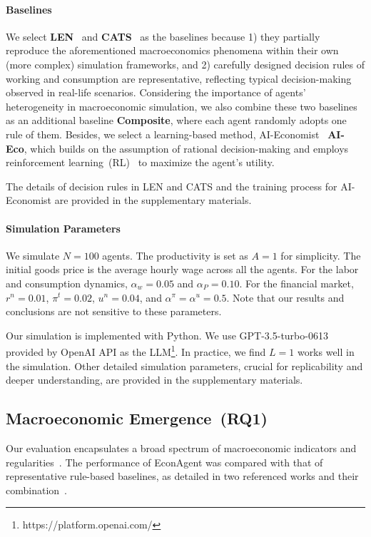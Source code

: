 \paragraph{Baselines} We select \textbf{LEN}~\cite{lengnick2013agent} and \textbf{CATS}~\cite{gatti2011macroeconomics} as the baselines because 1) they partially reproduce the aforementioned macroeconomics phenomena within their own (more complex) simulation frameworks, and 2) carefully designed decision rules of working and consumption are representative, reflecting typical decision-making observed in real-life scenarios. Considering the importance of agents' heterogeneity in macroeconomic simulation, we also combine these two baselines as an additional baseline \textbf{Composite}, where each agent randomly adopts one rule of them.
Besides, we select a learning-based method, AI-Economist~\cite{zheng2022ai} \textbf{AI-Eco}, which builds on the assumption of rational decision-making and employs reinforcement learning~(RL)~\cite{arulkumaran2017deep} to maximize the agent's utility. 



The details of decision rules in LEN and CATS and the training process for AI-Economist are provided in the supplementary materials.

\paragraph{Simulation Parameters} 
We simulate $N=100$ agents. The productivity is set as $A = 1$ for simplicity. The initial goods price is the average hourly wage across all the agents. For the labor and consumption dynamics, $\alpha_w = 0.05$ and $\alpha_P = 0.10$. For the financial market, $r^n = 0.01$, $\pi^t = 0.02$, $u^n = 0.04$, and $\alpha^{\pi} = \alpha^u = 0.5$. Note that our results and conclusions are not sensitive to these parameters.

Our simulation is implemented with Python. We use GPT-3.5-turbo-0613 provided by OpenAI API as the LLM\footnote{https://platform.openai.com/}. In practice, we find $L=1$ works well in the simulation. Other detailed simulation parameters, crucial for replicability and deeper understanding, are provided in the supplementary materials.

\subsection{Macroeconomic Emergence~(RQ1)}
Our evaluation encapsulates a broad spectrum of macroeconomic indicators and regularities~\cite{lengnick2013agent,gatti2011macroeconomics,dawid2018agent,axtell2022agent}. The performance of EconAgent was compared with that of representative rule-based baselines, as detailed in two referenced works and their combination~\cite{lengnick2013agent,gatti2011macroeconomics}. 

